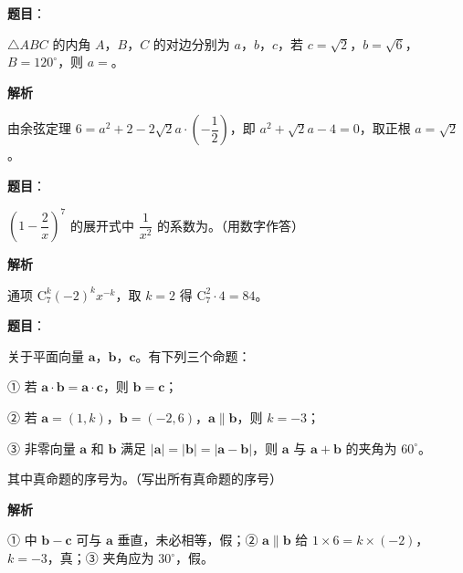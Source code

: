 \begin{answer}

\textbf{题目}：

$\triangle ABC$ 的内角 $A$，$B$，$C$ 的对边分别为 $a$，$b$，$c$，若 $c=\sqrt2$，$b=\sqrt6$，$B=120^\circ$，则 $a=$\gkblank{}。

\textbf{解析}

由余弦定理 $6=a^2+2-2\sqrt2a\cdot\left(-\dfrac12\right)$，即 $a^2+\sqrt2a-4=0$，取正根 $a=\sqrt2$。


\end{answer}
\begin{answer}

\textbf{题目}：

$\left(1-\dfrac2x\right)^7$ 的展开式中 $\dfrac1{x^2}$ 的系数为\gkblank{}。（用数字作答）

\textbf{解析}

通项 $\mathrm C_7^k(-2)^kx^{-k}$，取 $k=2$ 得 $\mathrm C_7^2\cdot4=84$。


\end{answer}
\begin{answer}

\textbf{题目}：

关于平面向量 $\boldsymbol a$，$\boldsymbol b$，$\boldsymbol c$。有下列三个命题：

① 若 $\boldsymbol a\cdot\boldsymbol b=\boldsymbol a\cdot\boldsymbol c$，则 $\boldsymbol b=\boldsymbol c$；

② 若 $\boldsymbol a=(1,k)$，$\boldsymbol b=(-2,6)$，$\boldsymbol a\parallel\boldsymbol b$，则 $k=-3$；

③ 非零向量 $\boldsymbol a$ 和 $\boldsymbol b$ 满足 $|\boldsymbol a|=|\boldsymbol b|=|\boldsymbol a-\boldsymbol b|$，则 $\boldsymbol a$ 与 $\boldsymbol a+\boldsymbol b$ 的夹角为 $60^\circ$。

其中真命题的序号为\gkblank{}。（写出所有真命题的序号）

\textbf{解析}

① 中 $\boldsymbol b-\boldsymbol c$ 可与 $\boldsymbol a$ 垂直，未必相等，假；② $\boldsymbol a\parallel\boldsymbol b$ 给 $1\times6=k\times(-2)$，$k=-3$，真；③ 夹角应为 $30^\circ$，假。


\end{answer}
